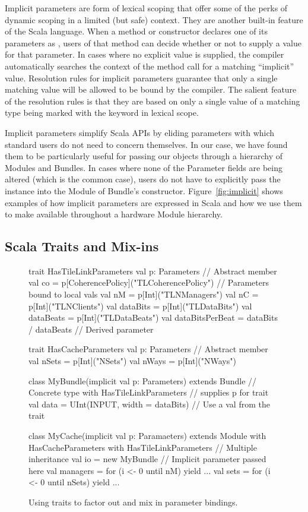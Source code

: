 Implicit parameters are form of lexical scoping that offer some of the perks of dynamic scoping in a limited (but safe) context.
They are another built-in feature of the Scala language.
When a method or constructor declares one of its parameters as , 
users of that method can decide whether or not to supply a value for that parameter.
In cases where no explicit value is supplied, the compiler automatically searches the context
of the method call for a matching ``implicit'' value.
Resolution rules for implicit parameters guarantee that only a single matching value will be allowed to be bound by the compiler.
The salient feature of the  resolution rules is that they are based on only
a single value of a matching type being marked with the  keyword in lexical scope.

Implicit parameters simplify Scala APIs by eliding parameters with which standard users do not need to concern themselves.
In our case, we have found them to be particularly useful for passing our  objects through a hierarchy of Modules and Bundles.
In cases where none of the Parameter fields are being altered (which is the common case),
users do not have to explicitly pass the  instance into the Module of Bundle's constructor.
Figure~\ref{fig:implicit} shows examples of how implicit parameters are expressed in Scala and how we use them to make 
available throughout a hardware Module hierarchy.
  
\subsection{Scala Traits and Mix-ins}

\begin{figure}
\centering
\begin{scala}
trait HasTileLinkParameters {
  val p: Parameters // Abstract member
  val co = p[CoherencePolicy]("TLCoherencePolicy") // Parameters bound to local vals
  val nM = p[Int]("TLNManagers")
  val nC = p[Int]("TLNClients")
  val dataBits = p[Int]("TLDataBits")
  val dataBeats = p[Int]("TLDataBeats")
  val dataBitsPerBeat = dataBits / dataBeats // Derived parameter
}

trait HasCacheParameters {
  val p: Parameters // Abstract member
  val nSets = p[Int]("NSets")
  val nWays = p[Int]("NWays")
}

class MyBundle(implicit val p: Parameters) extends Bundle // Concrete type
    with HasTileLinkParameters {                          // supplies p for trait
  val data = UInt(INPUT, width = dataBits) // Use a val from the trait
}

class MyCache(implicit val p: Paramaeters) extends Module
    with HasCacheParameters
    with HasTileLinkParameters { // Multiple inheritance
  val io = new MyBundle // Implicit parameter passed here
  val managers = for (i <- 0 until nM) yield { ... }
  val sets = for (i <- 0 until nSets) yield { ... }
}
\end{scala} 
\caption{Using traits to factor out and mix in parameter bindings.}
\label{fig:mixin}
\end{figure}

